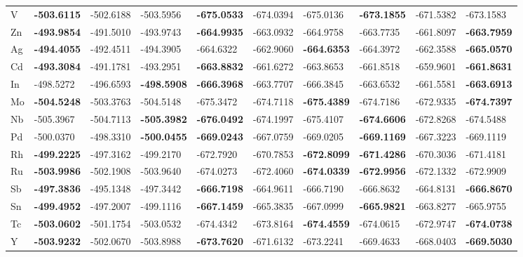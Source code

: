 \begin{table}[h]
{\begin{tabular}{*{10}{l}}
      V  & \textbf{-503.6115} & -502.6188 & -503.5956 & \textbf{-675.0533} & -674.0394 & -675.0136 & \textbf{-673.1855} & -671.5382 & -673.1583 \\
      Zn & \textbf{-493.9854} & -491.5010 & -493.9743 & \textbf{-664.9935} & -663.0932 & -664.9758 & -663.7735 & -661.8097 & \textbf{-663.7959} \\
      Ag & \textbf{-494.4055} & -492.4511 & -494.3905 & -664.6322 & -662.9060 & \textbf{-664.6353} & -664.3972 & -662.3588 & \textbf{-665.0570} \\
      Cd & \textbf{-493.3084} & -491.1781 & -493.2951 & \textbf{-663.8832} & -661.6272 & -663.8653 & -661.8518 & -659.9601 & \textbf{-661.8631} \\
      In & -498.5272 & -496.6593 & \textbf{-498.5908} & \textbf{-666.3968} & -663.7707 & -666.3845 & -663.6532 & -661.5581 & \textbf{-663.6913} \\
      Mo & \textbf{-504.5248} & -503.3763 & -504.5148 & -675.3472 & -674.7118 & \textbf{-675.4389} & -674.7186 & -672.9335 & \textbf{-674.7397} \\
      Nb & -505.3967 & -504.7113 & \textbf{-505.3982} & \textbf{-676.0492} & -674.1997 & -675.4107 & \textbf{-674.6606} & -672.8268 & -674.5488 \\
      Pd & -500.0370 & -498.3310 & \textbf{-500.0455} & \textbf{-669.0243} & -667.0759 & -669.0205 & \textbf{-669.1169} & -667.3223 & -669.1119 \\
      Rh & \textbf{-499.2225} & -497.3162 & -499.2170 & -672.7920 & -670.7853 & \textbf{-672.8099} & \textbf{-671.4286} & -670.3036 & -671.4181 \\
      Ru & \textbf{-503.9986} & -502.1908 & -503.9640 & -674.0273 & -672.4060 & \textbf{-674.0339} & \textbf{-672.9956} & -672.1332 & -672.9909 \\
      Sb & \textbf{-497.3836} & -495.1348 & -497.3442 & \textbf{-666.7198} & -664.9611 & -666.7190 & -666.8632 & -664.8131 & \textbf{-666.8670} \\
      Sn & \textbf{-499.4952} & -497.2007 & -499.1116 & \textbf{-667.1459} & -665.3835 & -667.0999 & \textbf{-665.9821} & -663.8277 & -665.9755 \\
      Tc & \textbf{-503.0602} & -501.1754 & -503.0532 & -674.4342 & -673.8164 & \textbf{-674.4559} & -674.0615 & -672.9747 & \textbf{-674.0738} \\
      Y  & \textbf{-503.9232} & -502.0670 & -503.8988 & \textbf{-673.7620} & -671.6132 & -673.2241 & -669.4633 & -668.0403 & \textbf{-669.5030} \\

\end{tabular}}
\end{table}
